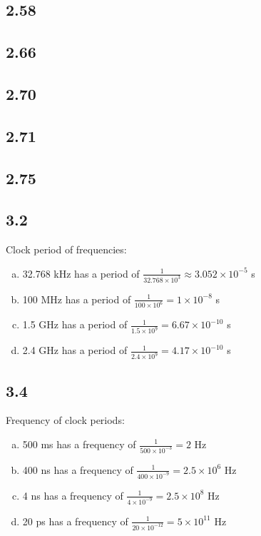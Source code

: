 \documentclass{article}
\begin{document}
\subsection*{2.58}

\subsection*{2.66}

\subsection*{2.70}

\subsection*{2.71}

\subsection*{2.75}

\subsection*{3.2}
Clock period of frequencies:
\begin{enumerate}[(a)]
    \item 32.768 kHz has a period of $\frac{1}{32.768 \times 10^3} \approx 3.052 \times 10^{-5}$ s
    \item 100 MHz has a period of $\frac{1}{100 \times 10^6} = 1 \times 10^{-8}$ s
    \item 1.5 GHz has a period of $\frac{1}{1.5 \times 10^9} = 6.67 \times 10^{-10}$ s
    \item 2.4 GHz has a period of $\frac{1}{2.4 \times 10^9} = 4.17 \times 10^{-10}$ s
\end{enumerate}

\subsection*{3.4}
Frequency of clock periods:
\begin{enumerate}[(a)]
    \item 500 ms has a frequency of $\frac{1}{500 \times 10^{-3}} = 2$ Hz
    \item 400 ns has a frequency of $\frac{1}{400 \times 10^{-9}} = 2.5 \times 10^6$ Hz
    \item 4 ns has a frequency of $\frac{1}{4 \times 10^{-9}} = 2.5 \times 10^8$ Hz
    \item 20 ps has a frequency of $\frac{1}{20 \times 10^{-12}} = 5 \times 10^{11}$ Hz
\end{enumerate}
\end{document}
